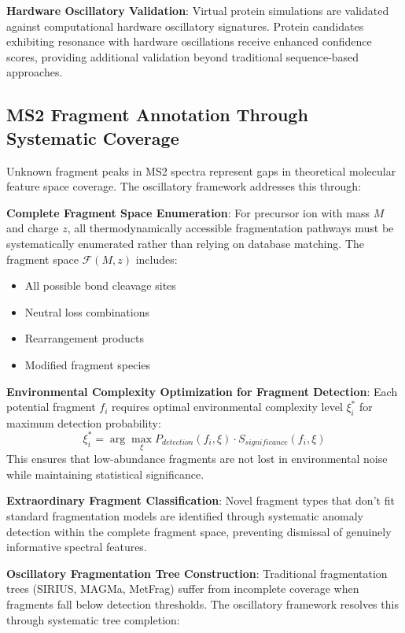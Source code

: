 \documentclass[11pt,a4paper]{article}
\begin{document}
\textbf{Hardware Oscillatory Validation}: Virtual protein simulations are validated against computational hardware oscillatory signatures. Protein candidates exhibiting resonance with hardware oscillations receive enhanced confidence scores, providing additional validation beyond traditional sequence-based approaches.

\subsection{MS2 Fragment Annotation Through Systematic Coverage}

Unknown fragment peaks in MS2 spectra represent gaps in theoretical molecular feature space coverage. The oscillatory framework addresses this through:

\textbf{Complete Fragment Space Enumeration}: For precursor ion with mass $M$ and charge $z$, all thermodynamically accessible fragmentation pathways must be systematically enumerated rather than relying on database matching. The fragment space $\mathcal{F}(M,z)$ includes:
\begin{itemize}
\item All possible bond cleavage sites
\item Neutral loss combinations
\item Rearrangement products
\item Modified fragment species
\end{itemize}

\textbf{Environmental Complexity Optimization for Fragment Detection}: Each potential fragment $f_i$ requires optimal environmental complexity level $\xi_i^*$ for maximum detection probability:
\begin{equation}
\xi_i^* = \arg\max_\xi P_{detection}(f_i, \xi) \cdot S_{significance}(f_i, \xi)
\end{equation}
This ensures that low-abundance fragments are not lost in environmental noise while maintaining statistical significance.

\textbf{Extraordinary Fragment Classification}: Novel fragment types that don't fit standard fragmentation models are identified through systematic anomaly detection within the complete fragment space, preventing dismissal of genuinely informative spectral features.

\textbf{Oscillatory Fragmentation Tree Construction}: Traditional fragmentation trees (SIRIUS, MAGMa, MetFrag) suffer from incomplete coverage when fragments fall below detection thresholds. The oscillatory framework resolves this through systematic tree completion:
\end{document}
